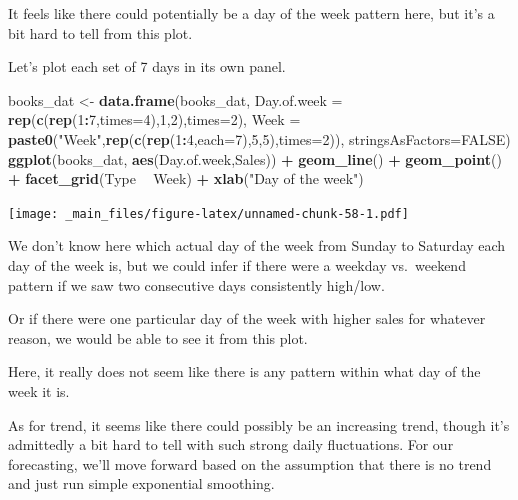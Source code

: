 \documentclass[]{book}
\newenvironment{Shaded}{\begin{snugshade}}{\end{snugshade}}
\newcommand{\DataTypeTok}[1]{\textcolor[rgb]{0.13,0.29,0.53}{#1}}
\newcommand{\DecValTok}[1]{\textcolor[rgb]{0.00,0.00,0.81}{#1}}
\newcommand{\KeywordTok}[1]{\textcolor[rgb]{0.13,0.29,0.53}{\textbf{#1}}}
\newcommand{\NormalTok}[1]{#1}
\newcommand{\OperatorTok}[1]{\textcolor[rgb]{0.81,0.36,0.00}{\textbf{#1}}}
\newcommand{\OtherTok}[1]{\textcolor[rgb]{0.56,0.35,0.01}{#1}}
\newcommand{\StringTok}[1]{\textcolor[rgb]{0.31,0.60,0.02}{#1}}
\begin{document}
It feels like there could potentially be a day of the week pattern here, but it's a bit hard to tell from this plot.

Let's plot each set of 7 days in its own panel.

\begin{Shaded}
\begin{Highlighting}[]
\NormalTok{books_dat <-}\StringTok{ }\KeywordTok{data.frame}\NormalTok{(books_dat,}
    \DataTypeTok{Day.of.week =} \KeywordTok{rep}\NormalTok{(}\KeywordTok{c}\NormalTok{(}\KeywordTok{rep}\NormalTok{(}\DecValTok{1}\OperatorTok{:}\DecValTok{7}\NormalTok{,}\DataTypeTok{times=}\DecValTok{4}\NormalTok{),}\DecValTok{1}\NormalTok{,}\DecValTok{2}\NormalTok{),}\DataTypeTok{times=}\DecValTok{2}\NormalTok{),}
    \DataTypeTok{Week =} \KeywordTok{paste0}\NormalTok{(}\StringTok{"Week"}\NormalTok{,}\KeywordTok{rep}\NormalTok{(}\KeywordTok{c}\NormalTok{(}\KeywordTok{rep}\NormalTok{(}\DecValTok{1}\OperatorTok{:}\DecValTok{4}\NormalTok{,}\DataTypeTok{each=}\DecValTok{7}\NormalTok{),}\DecValTok{5}\NormalTok{,}\DecValTok{5}\NormalTok{),}\DataTypeTok{times=}\DecValTok{2}\NormalTok{)),}
    \DataTypeTok{stringsAsFactors=}\OtherTok{FALSE}\NormalTok{)}
\KeywordTok{ggplot}\NormalTok{(books_dat,}
\KeywordTok{aes}\NormalTok{(Day.of.week,Sales)) }\OperatorTok{+}
\KeywordTok{geom_line}\NormalTok{() }\OperatorTok{+}
\KeywordTok{geom_point}\NormalTok{() }\OperatorTok{+}
\KeywordTok{facet_grid}\NormalTok{(Type }\OperatorTok{~}\StringTok{ }\NormalTok{Week) }\OperatorTok{+}
\KeywordTok{xlab}\NormalTok{(}\StringTok{"Day of the week"}\NormalTok{)}
\end{Highlighting}
\end{Shaded}

\texttt{[image: \_main\_files/figure-latex/unnamed-chunk-58-1.pdf]}

We don't know here which actual day of the week from Sunday to Saturday each day of the week is, but we could infer if there were a weekday vs.~weekend pattern if we saw two consecutive days consistently high/low.

Or if there were one particular day of the week with higher sales for whatever reason, we would be able to see it from this plot.

Here, it really does not seem like there is any pattern within what day of the week it is.

As for trend, it seems like there could possibly be an increasing trend, though it's admittedly a bit hard to tell with such strong daily fluctuations. For our forecasting, we'll move forward based on the assumption that there is no trend and just run simple exponential smoothing.
\end{document}
